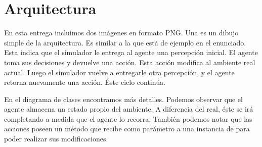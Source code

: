 \section{Arquitectura}

En esta entrega incluimos dos imágenes en formato PNG. Una es un dibujo simple
de la arquitectura. Es similar a la que está de ejemplo en el enunciado. Esta
indica que el simulador le entrega al agente una percepción inicial. El agente
toma sus decisiones y devuelve una acción. Esta acción modifica al ambiente
real actual. Luego el simulador vuelve a entregarle otra percepción, y el
agente retorna nuevamente una acción. Éste ciclo continúa.

En el diagrama de clases encontramos más detalles. Podemos observar que el
agente almacena un estado propio del ambiente. A diferencia del real, éste se
irá completando a medida que el agente lo recorra. También podemos notar que
las acciones poseen un método  que recibe como parámetro a una
instancia de  para poder realizar sus modificaciones.
